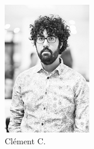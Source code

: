 \begin{figure}[h!]
\begin{subfigure}[b]{0.2\textwidth}
                \includegraphics[width=\textwidth]{images/clement-c-serieux.png}
                \caption{Clément C.}
            \end{subfigure}
            \begin{subfigure}[b]{0.2\textwidth}

\end{subfigure}
\end{figure}

